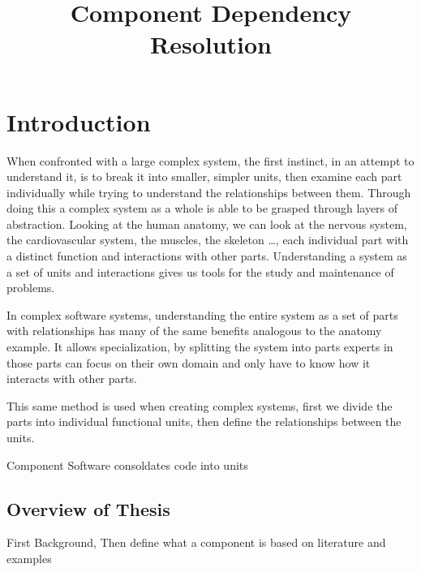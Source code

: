 \documentclass{report}
\title{Component Dependency Resolution}
\begin{document}
\chapter{Introduction}

{}When confronted with a large complex system, the first instinct, in an attempt to understand it, is to break it into smaller, simpler units, 
{}then examine each part individually while trying to understand the relationships between them.
{}Through doing this a complex system as a whole is able to be grasped through layers of abstraction.
{}Looking at the human anatomy, we can look at the nervous system, the cardiovascular system, the muscles, the skeleton \ldots,
{}each individual part with a distinct function and interactions with other parts.
{}Understanding a system as a set of units and interactions gives us tools for the study and maintenance of problems.  

{}In complex software systems, understanding the entire system as a set of parts with relationships has many of the same benefits analogous to the anatomy example.
{}It allows specialization, 
{}by splitting the system into parts experts in those parts can focus on their own domain and only have to know how it interacts with other parts.

{}This same method is used when creating complex systems, first we divide the parts into individual functional units,
{}then define the relationships between the units.


Component Software consoldates code into units


\section{Overview of Thesis}
First Background,
Then define what a component is based on literature and examples














\end{document}
